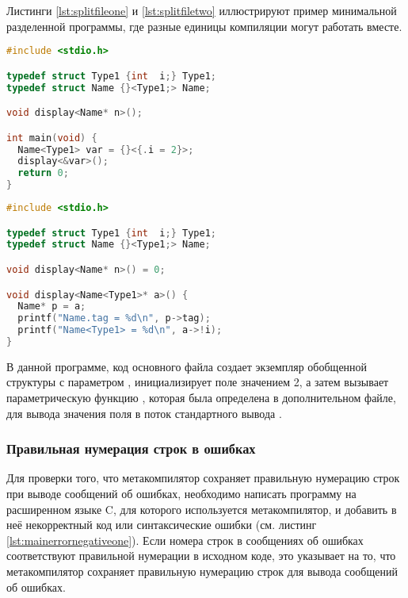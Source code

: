 Листинги \ref{lst:splitfileone} и \ref{lst:splitfiletwo} иллюстрируют пример минимальной разделенной программы, где разные единицы компиляции могут работать вместе.

\noindent
\begin{minipage}[t]{.5\textwidth}
\begin{lstlisting}[language=c, caption={Пример основного файла разделённой программы}, xleftmargin=0mm, frame=L, label={lst:splitfileone}]
#include <stdio.h>

typedef struct Type1 {int  i;} Type1;
typedef struct Name {}<Type1;> Name;

void display<Name* n>();

int main(void) {
  Name<Type1> var = {}<{.i = 2}>;
  display<&var>();
  return 0;
}
\end{lstlisting}
\end{minipage}%
\begin{minipage}[t]{.5\textwidth}
\begin{lstlisting}[language=c, caption={Пример вторичного файла разделённой программы}, xleftmargin=0mm, frame=LR, label={lst:splitfiletwo}]
#include <stdio.h>

typedef struct Type1 {int  i;} Type1;
typedef struct Name {}<Type1;> Name;

void display<Name* n>() = 0;

void display<Name<Type1>* a>() {
  Name* p = a;
  printf("Name.tag = %d\n", p->tag);
  printf("Name<Type1> = %d\n", a->!i);
}
\end{lstlisting}
\end{minipage}

В данной программе, код основного файла создает экземпляр обобщенной структуры  с параметром , инициализирует поле  значением 2, а затем вызывает параметрическую функцию , которая была определена в дополнительном файле, для вывода значения поля  в поток стандартного вывода .

\subsubsection{Правильная нумерация строк в ошибках}
Для проверки того, что метакомпилятор сохраняет правильную нумерацию строк при выводе сообщений об ошибках, необходимо
написать программу на расширенном языке C, для которого используется метакомпилятор, и добавить в неё некорректный код или синтаксические ошибки (см. листинг \ref{lst:mainerrornegativeone}).
Если номера строк в сообщениях об ошибках соответствуют правильной нумерации в исходном коде, это указывает на то, что метакомпилятор сохраняет правильную нумерацию строк для вывода сообщений об ошибках.

